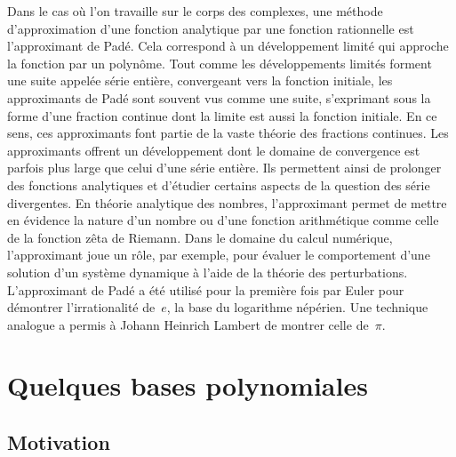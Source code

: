  Dans le cas où l'on travaille sur le corps des complexes, une méthode d'approximation d'une fonction analytique par une fonction rationnelle est l'approximant de Padé. Cela correspond à un développement limité qui approche la fonction par un polynôme. Tout comme les développements limités forment une suite appelée série entière, convergeant vers la fonction initiale, les approximants de Padé sont souvent vus comme une suite, s'exprimant sous la forme d'une fraction continue dont la limite est aussi la fonction initiale. En ce sens, ces approximants font partie de la vaste théorie des fractions continues. Les approximants offrent un développement dont le domaine de convergence est parfois plus large que celui d'une série entière. Ils permettent ainsi de prolonger des fonctions analytiques et d'étudier certains aspects de la question des série divergentes. En théorie analytique des nombres, l'approximant permet de mettre en évidence la nature d'un nombre ou d'une fonction arithmétique comme celle de la fonction zêta de Riemann. Dans le domaine du calcul numérique, l'approximant joue un rôle, par exemple, pour évaluer le comportement d'une solution d'un système dynamique à l'aide de la théorie des perturbations. L'approximant de Padé a été utilisé pour la première fois par Euler pour démontrer l'irrationalité de~$e$, la base du logarithme népérien. Une technique analogue a permis à Johann Heinrich Lambert de montrer celle de~$\pi$.


\medskip
\section{Quelques bases polynomiales} 

\medskip
\subsection{Motivation}\label{Sec-Taylor}


